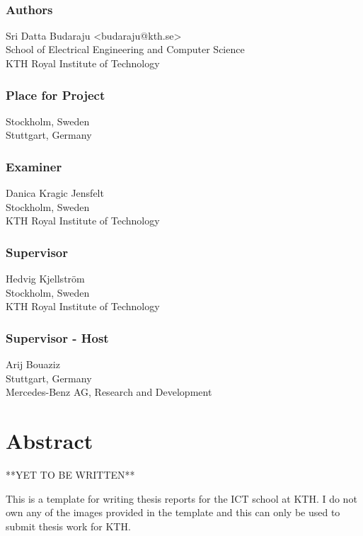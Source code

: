 \newpage
\thispagestyle{plain}
~\\
\vfill
{ 
	\subsection*{Authors}
	Sri Datta Budaraju <budaraju@kth.se>\\
    School of Electrical Engineering and Computer Science\\
	KTH Royal Institute of Technology
	
	\subsection*{Place for Project}
	Stockholm, Sweden\\
	Stuttgart, Germany

	\subsection*{Examiner}
	Danica Kragic Jensfelt\\
	Stockholm, Sweden\\
	KTH Royal Institute of Technology
	
	\subsection*{Supervisor }
	Hedvig Kjellström\\
	Stockholm, Sweden\\
	KTH Royal Institute of Technology
	
	\subsection*{Supervisor - Host}
	Arij Bouaziz\\
	Stuttgart, Germany\\
	Mercedes-Benz AG,  Research and Development
	~
}

\newpage
\thispagestyle{plain}
\chapter*{Abstract}
**YET TO BE WRITTEN**

This is a template for writing thesis reports for the ICT school at KTH. I do not own any of the images provided in the template and this can only be used to submit thesis work for KTH.

